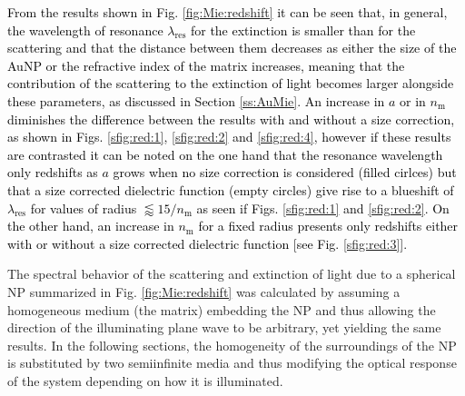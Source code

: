 \textcolor{black}{
From the results shown in Fig. \ref{fig:Mie:redshift} it can be seen that, in general, the wavelength of resonance  $\lambda_\text{res}$ for the extinction is smaller than for the scattering  and that the distance between them decreases as either the size of the AuNP or the refractive index of the matrix increases, meaning that the contribution of the scattering to the extinction of light becomes larger alongside these parameters, as discussed in Section \ref{ss:AuMie}. An increase in $a$ or in $n_\text{m}$ diminishes the difference between the results with and without a size correction, as shown in Figs. \ref{sfig:red:1}, \ref{sfig:red:2} and \ref{sfig:red:4},  however if these results are contrasted  it can be noted on the one hand that the resonance wavelength only redshifts as $a$ grows when no size correction is considered (filled cirlces) but that a size corrected dielectric function (empty circles) give rise to a blueshift of $\lambda_\text{res}$ for values of radius $\lessapprox 15/n_\text{m}$ as seen if Figs. \ref{sfig:red:1} and \ref{sfig:red:2}. On the other hand, an increase in $n_\text{m}$ for a fixed radius presents only redshifts either with or without a size corrected dielectric function [see Fig. \ref{sfig:red:3}].
}

The spectral behavior of the scattering and extinction of light due to a spherical NP summarized in Fig. \ref{fig:Mie:redshift} was calculated by assuming a homogeneous medium (the matrix) embedding the NP and thus allowing the direction of the illuminating plane wave to be arbitrary, yet yielding the same results. In the following sections, the homogeneity of the surroundings of the NP is substituted by two semiinfinite media and thus modifying the optical response of the system depending on how it is illuminated.
